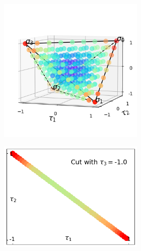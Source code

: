 \documentclass[10pt,letterpaper]{article} %
\begin{document}
\begin{figure}
\centering
\begin{subfigure}{0.9\textwidth}
\begin{subfigure}{.666\textwidth}
\centering
\includegraphics[width=.95\columnwidth]{images/tetra-def.png}
\end{subfigure}%
\begin{subfigure}{.333\textwidth}
\includegraphics[width=.95\columnwidth]{images/corte1-2.png} \\

\end{subfigure}
\end{subfigure}
\end{figure}
\end{document}
